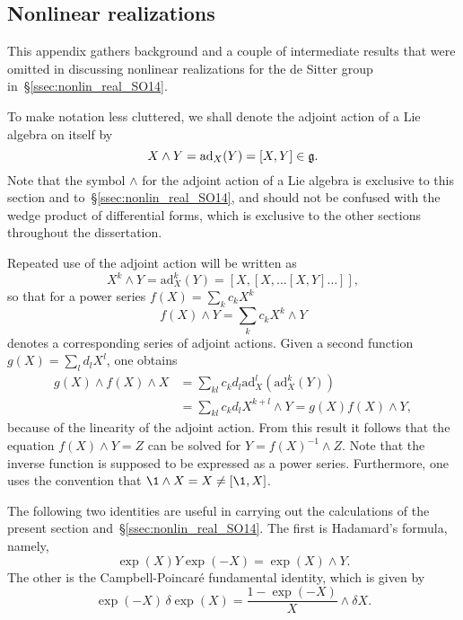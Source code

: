 \documentclass[
final,
11pt,
a4paper,
DIV=11,
headinclude=true,
footinclude=false,
bibliography=totoc,
twoside=true,  %
BCOR=5mm
]{scrbook}
\begin{document}
\begin{subappendices}
\section{Nonlinear realizations}
\label{app:nonlin_real}

This appendix gathers background and a couple of intermediate 
results that were omitted in discussing nonlinear realizations 
for the de Sitter group in~\S\ref{ssec:nonlin_real_SO14}.

To make notation less cluttered, we shall denote the adjoint 
action of a Lie algebra on itself by
\begin{equation*}
  X \wedge Y = \mathrm{ad}_X (Y) = [X,Y] \in \mathfrak{g}.
\end{equation*}
Note that the symbol $\wedge$ for the adjoint action of a Lie 
algebra is exclusive to this section and 
to~\S\ref{ssec:nonlin_real_SO14}, and should not be confused with 
the wedge product of differential forms, which is exclusive to 
the other sections throughout the dissertation.

Repeated use of the adjoint action will be written as
\begin{equation*}
  X^k \wedge Y = \mathrm{ad}_X^k (Y) = [X,[X,\ldots[X,Y]\ldots]],
\end{equation*}
so that for a power series $f(X) = \sum_k c_k X^k$
\begin{equation*}
  f(X) \wedge Y = \sum_k c_k X^k \wedge Y
\end{equation*}
denotes a corresponding series of adjoint actions. Given a second 
function $g(X) = \sum_l d_l X^l$, one obtains
\begin{equation*}
\begin{split}
  g(X)\wedge f(X)\wedge X &= \sum_{kl} c_k d_l
  \mathrm{ad}_X^l(\mathrm{ad}_X^k(Y)) \\
  &= \sum_{kl} c_k d_l X^{k+l} \wedge Y = g(X)f(X) \wedge Y,
\end{split}
\end{equation*}
because of the linearity of the adjoint action.
From this result it follows that the equation $f(X) \wedge Y = Z$ 
can be solved for $Y = {f(X)}^{-1} \wedge Z$. Note that the 
inverse function is supposed to be expressed as a power series.  
Furthermore, one uses the convention that $\1 \wedge X = X \neq 
[\1, X]$.

The following two identities are useful in carrying out the 
calculations of the present section 
and~\S\ref{ssec:nonlin_real_SO14}. The first is Hadamard's 
formula, namely,
\begin{equation}
\label{eq:Had}
  \exp(X) Y \exp(-X) = \exp(X) \wedge Y.
\end{equation}
The other is the Campbell-Poincar\'e fundamental identity, which 
is given by
\begin{equation}
\label{eq:CPfundId}
  \exp(-X)\, \delta\!\exp(X) = \frac{1-\exp(-X)}{X}\wedge \delta 
  X.
\end{equation}


\end{subappendices}
\end{document}
